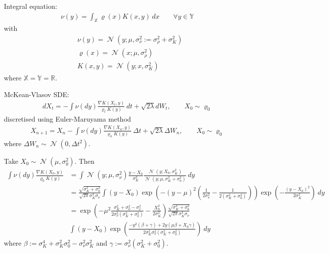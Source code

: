 \documentclass[a4paper]{amsart}
\newcommand{\X}{\ensuremath{\mathbb{X}}\xspace}
\newcommand{\Y}{\ensuremath{\mathbb{Y}}\xspace}
\def\real{\mathbb{R}}
\DeclareMathOperator{\N}{\mathcal{N}}
\begin{document}
Integral equation:
\begin{align*}
\nu(y) = \int_{\X} \varrho(x)K(x, y)\ dx \qquad \forall y\in \Y
\end{align*}
with
\begin{align*}
& \nu(y) = \N(y; \mu, \sigma_{\nu}^2:= \sigma_{\rho}^2 + \sigma_K^2)\\
& \varrho(x) = \N(x; \mu, \sigma_{\rho}^2)\\
& K(x, y) = \N(y; x, \sigma_K^2)
\end{align*}
where $\X = \Y = \real$.

McKean-Vlasov SDE:
\begin{align*}
dX_t = -\int \nu(dy)\frac{\nabla K(X_t, y)}{\varrho_tK(y)}\ dt + \sqrt{2\lambda}dW_t,\qquad X_0\sim \varrho_0 
\end{align*}
discretised using Euler-Maruyama method
\begin{align*}
X_{n+1} = X_n -\int \nu(dy)\frac{\nabla K(X_n, y)}{\varrho_n K(y)}\ \Delta t + \sqrt{2\lambda}\Delta W_n,\qquad X_0\sim \varrho_0 
\end{align*}
where $\Delta W_n \sim \N(0, \Delta t^2)$.

Take $X_0\sim \N(\mu, \sigma_0^2)$. Then
\begin{align*}
\int \nu(dy)\frac{\nabla K(X_0, y)}{\varrho_0 K(y)} &= \int \N(y; \mu, \sigma_{\nu}^2)\frac{y - X_0}{\sigma_K^2}\frac{\N(y; X_0, \sigma_K^2)}{\N(y; \mu, \sigma_K^2 + \sigma_0^2)}\ dy\\
&= \frac{\sqrt{\sigma_K^2 + \sigma_0^2}}{\sqrt{2\pi}\sigma_K^3\sigma_{\nu}}\int (y - X_0)\exp\left( -(y - \mu)^2\left(\frac{1}{2\sigma_{\nu}^2} - \frac{1}{2(\sigma_K^2 + \sigma_0^2)} \right)\right)\exp\left( -\frac{(y - X_0)^2}{2\sigma_K^2}\right)\ dy\\
&= \exp\left( -\mu^2\frac{\sigma_K^2 + \sigma_0^2 - \sigma_{\nu}^2}{2\sigma_{\nu}^2(\sigma_K^2 + \sigma_0^2)} - \frac{X_0^2}{2\sigma_K^2}\right)\frac{\sqrt{\sigma_K^2 + \sigma_0^2}}{\sqrt{2\pi}\sigma_K^3\sigma_{\nu}}\\
&\int (y - X_0)\exp\left( \frac{-y^2(\beta + \gamma)+2y(\mu \beta + X_0\gamma)}{2\sigma_K^2\sigma_{\nu}^2(\sigma_K^2 + \sigma_0^2)}\right)\ dy
\end{align*}
where $\beta := \sigma_K^4 + \sigma_K^2\sigma_0^2 - \sigma_{\nu}^2\sigma_K^2$ and $\gamma := \sigma_{\nu}^2(\sigma_K^2 + \sigma_0^2)$.
\end{document}
